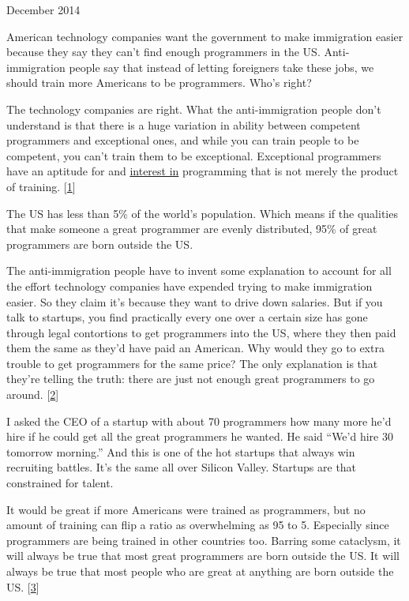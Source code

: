 December 2014

American technology companies want the government to make immigration
easier because they say they can't find enough programmers in the US.
Anti-immigration people say that instead of letting foreigners take
these jobs, we should train more Americans to be programmers. Who's
right?

The technology companies are right. What the anti-immigration people
don't understand is that there is a huge variation in ability between
competent programmers and exceptional ones, and while you can train
people to be competent, you can't train them to be exceptional.
Exceptional programmers have an aptitude for and
\href{genius.html}{interest in} programming that is not merely the
product of training. {[}\hyperref[f1n]{1}{]}

The US has less than 5\% of the world's population. Which means if the
qualities that make someone a great programmer are evenly distributed,
95\% of great programmers are born outside the US.

The anti-immigration people have to invent some explanation to account
for all the effort technology companies have expended trying to make
immigration easier. So they claim it's because they want to drive down
salaries. But if you talk to startups, you find practically every one
over a certain size has gone through legal contortions to get
programmers into the US, where they then paid them the same as they'd
have paid an American. Why would they go to extra trouble to get
programmers for the same price? The only explanation is that they're
telling the truth: there are just not enough great programmers to go
around. {[}\hyperref[f2n]{2}{]}

I asked the CEO of a startup with about 70 programmers how many more
he'd hire if he could get all the great programmers he wanted. He said
``We'd hire 30 tomorrow morning.'' And this is one of the hot startups
that always win recruiting battles. It's the same all over Silicon
Valley. Startups are that constrained for talent.

It would be great if more Americans were trained as programmers, but no
amount of training can flip a ratio as overwhelming as 95 to 5.
Especially since programmers are being trained in other countries too.
Barring some cataclysm, it will always be true that most great
programmers are born outside the US. It will always be true that most
people who are great at anything are born outside the US.
{[}\hyperref[f3n]{3}{]}

